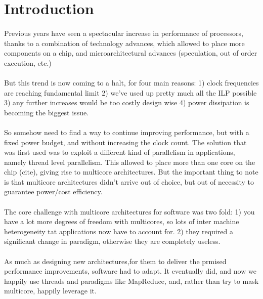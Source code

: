 \section{Introduction} 

\paragraph{}Previous years have seen a spectacular increase in 
performance of processors, thanks to a combination 
of technology advances, which allowed to place
more components on a chip, and microarchitectural 
advances (speculation, out of order execution, etc.)

\paragraph{}But this trend is now coming to a halt, for four main 
reasons: 
1) clock frequencies are reaching fundamental limit
2) we've used up pretty much all the ILP possible
3) any further increases would be too costly design wise
4) power dissipation is becoming the biggest issue. 

\paragraph{} So somehow need to find a way to continue improving 
performance, but with a fixed power budget, and without 
increasing the clock count. The solution that was
first used was to exploit a different kind of parallelism
in applications, namely thread level parallelism. This 
allowed to place more than one core on the chip (cite),
giving rise to multicore architectures. But the important thing
to note is that multicore architectures didn't arrive out of 
choice, but out of necessity to guarantee power/cost efficiency. 

\paragraph{} The core challenge with multicore architectures for software was two fold:
1) you have a lot more degrees of freedom with multicores, 
so lots of inter machine heterogeneity tat applications  now have 
to account for. 2)  they required
a significant change in paradigm, otherwise they are completely useless.

\paragraph{} As much as designing new architectures,for them to deliver the prmised performance improvements, software had to adapt. It eventually did, and now we happily use threads and paradigms like MapReduce, and, rather than try to mask multicore, happily leverage it.  

